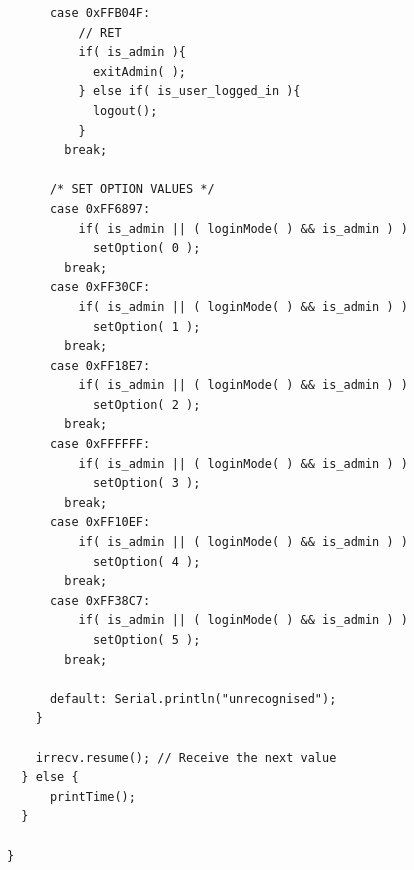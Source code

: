 \documentclass[a4paper,11pt]{article}
\theoremstyle{mytheor}
\begin{document}
\begin{lstlisting}
      case 0xFFB04F:
          // RET
          if( is_admin ){
            exitAdmin( );
          } else if( is_user_logged_in ){
            logout();
          }
        break;

      /* SET OPTION VALUES */
      case 0xFF6897: 
          if( is_admin || ( loginMode( ) && is_admin ) )
            setOption( 0 );
        break;
      case 0xFF30CF: 
          if( is_admin || ( loginMode( ) && is_admin ) )
            setOption( 1 );
        break;
      case 0xFF18E7: 
          if( is_admin || ( loginMode( ) && is_admin ) )
            setOption( 2 );
        break;
      case 0xFFFFFF: 
          if( is_admin || ( loginMode( ) && is_admin ) )
            setOption( 3 );
        break;
      case 0xFF10EF: 
          if( is_admin || ( loginMode( ) && is_admin ) )
            setOption( 4 );
        break;
      case 0xFF38C7: 
          if( is_admin || ( loginMode( ) && is_admin ) )
            setOption( 5 );
        break;

      default: Serial.println("unrecognised");
    }

    irrecv.resume(); // Receive the next value
  } else {
      printTime();
  }

}
\end{lstlisting}
\end{document}
